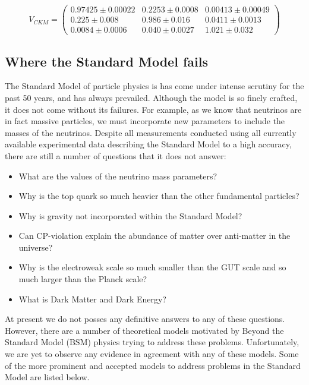 \begin{equation} \label{eqn-ckm}
V_{CKM}
=
\begin{pmatrix}
0.97425 \pm 0.00022 & 0.2253 \pm 0.0008 & 0.00413 \pm 0.00049 \\
0.225 \pm 0.008 & 0.986 \pm 0.016 & 0.0411 \pm 0.0013 \\
0.0084 \pm 0.0006 & 0.040 \pm 0.0027 & 1.021 \pm 0.032
\end{pmatrix}
\end{equation}

\subsection{Where the Standard Model fails} \label{subsec-SMFailures}

The Standard Model of particle physics is has come under intense scrutiny for the past 50 years, and has always prevailed. Although the model is so finely crafted, it does not come without its failures. For example, as we know that neutrinos are in fact massive particles, we must incorporate new parameters to include the masses of the neutrinos. Despite all measurements conducted using all currently available experimental data describing the Standard Model to a high accuracy, there are still a number of questions that it does not answer:

\begin{itemize}
	\item What are the values of the neutrino mass parameters?
	\item Why is the top quark so much heavier than the other fundamental particles?
	\item Why is gravity not incorporated within the Standard Model?
	\item Can CP-violation explain the abundance of matter over anti-matter in the universe?
	\item Why is the electroweak scale so much smaller than the GUT scale and so much larger than the Planck scale? 
	\item What is Dark Matter and Dark Energy?
\end{itemize} 

At present we do not posses any definitive answers to any of these questions. However, there are a number of theoretical models motivated by Beyond the Standard Model (BSM) physics trying to address these problems. Unfortunately, we are yet to observe any evidence in agreement with any of these models. Some of the more prominent and accepted models to address problems in the Standard Model are listed below.


